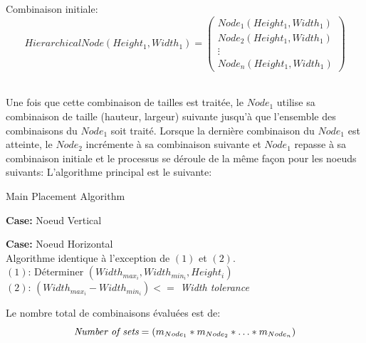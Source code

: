 \begin{algorithm}
Combinaison initiale:\\
\begin{equation}
  HierarchicalNode (Height_1, Width_1) = 
  \begin{pmatrix}
    Node_1(Height_1, Width_1)  \\
    Node_2(Height_1, Width_1)  \\
    \vdots            \\
    Node_n(Height_1, Width_1)  
  \end{pmatrix}
\end{equation}\\
\end{algorithm}
\vspace{-0.5cm}

Une fois que cette combinaison de tailles est traitée, le $Node_1$ utilise sa combinaison de taille (hauteur, largeur) suivante jusqu'à que l'ensemble des combinaisons du $Node_1$ soit traité. Lorsque la dernière combinaison du $Node_1$ est atteinte, le $Node_2$ incrémente à sa combinaison suivante et $Node_1$ repasse à sa combinaison initiale et le processus se déroule de la même façon pour les noeuds suivants: L'algorithme principal est le suivante:

\begin{algorithm}
\caption{Main Placement Algorithm}
{\bf Case:} Noeud Vertical \\
\vspace{0.25cm}

{\bf Case:} Noeud Horizontal \\
Algorithme identique à l'exception de $(1)$ et $(2)$.\\
$(1)$: Déterminer $(Width_{max_i}, Width_{min_i}, Height_{i})$\\
$(2)$: $(Width_{max_i} - Width_{min_i}) <=$ \textit{Width tolerance}\vspace{0.25cm}
\end{algorithm}
\newpage
Le nombre total de combinaisons évaluées est de: 
\vspace{-0.25cm}
\begin{equation}
\textit{Number of sets} =  (m_{Node_1} * m_{Node_2} * \hdots * m_{Node_n})\\
\end{equation}

